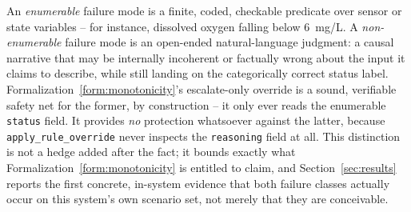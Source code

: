 \begin{formalization}
\label{form:enumerable}
An \emph{enumerable} failure mode is a finite, coded, checkable predicate over sensor or state
variables -- for instance, dissolved oxygen falling below 6~mg/L. A \emph{non-enumerable} failure
mode is an open-ended natural-language judgment: a causal narrative that may be internally
incoherent or factually wrong about the input it claims to describe, while still landing on the
categorically correct status label. Formalization~\ref{form:monotonicity}'s escalate-only override
is a sound, verifiable safety net for the former, by construction -- it only ever reads the
enumerable \texttt{status} field. It provides \emph{no} protection whatsoever against the latter,
because \texttt{apply\_rule\_override} never inspects the \texttt{reasoning} field at all. This
distinction is not a hedge added after the fact; it bounds exactly what
Formalization~\ref{form:monotonicity} is entitled to claim, and Section~\ref{sec:results} reports
the first concrete, in-system evidence that both failure classes actually occur on this system's
own scenario set, not merely that they are conceivable.
\end{formalization}

